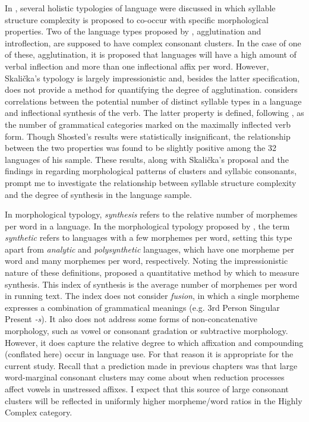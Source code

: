   In , several holistic typologies of language were discussed in which syllable structure complexity is proposed to co-occur with specific morphological properties. Two of the language types proposed by \citet{Skalička1979}, agglutination and introflection, are supposed to have complex consonant clusters. In the case of one of these, agglutination, it is proposed that languages will have a high amount of verbal inflection and more than one inflectional affix per word. However, Skalička’s typology is largely impressionistic and, besides the latter specification, does not provide a method for quantifying the degree of agglutination. \citet{Shosted2006} considers correlations between the potential number of distinct syllable types in a language and inflectional synthesis of the verb. The latter property is defined, following \citet{BickelNichols2005}, as the number of grammatical categories marked on the maximally inflected verb form. Though Shosted’s results were statistically insignificant, the relationship between the two properties was found to be slightly positive among the 32 languages of his sample. These results, along with Skalička’s proposal and the findings in  regarding morphological patterns of clusters and syllabic consonants, prompt me to investigate the relationship between syllable structure complexity and the degree of synthesis in the language sample.

  In morphological typology, \textit{synthesis} refers to the relative number of morphemes per word in a language. In the morphological typology proposed by \citet{Sapir1921}, the term \textit{synthetic} refers to languages with a few morphemes per word, setting this type apart from \textit{analytic} and \textit{polysynthetic} languages, which have one morpheme per word and many morphemes per word, respectively. Noting the impressionistic nature of these definitions, \citet{Greenberg1954} proposed a quantitative method by which to measure synthesis. This index of synthesis is the average number of morphemes per word in running text. The index does not consider \textit{fusion}, in which a single morpheme expresses a combination of grammatical meanings (e.g.  3rd Person Singular Present \textit{-s}). It also does not address some forms of non-concatenative morphology, such as vowel or consonant gradation or subtractive morphology. However, it does capture the relative degree to which affixation and compounding (conflated here) occur in language use. For that reason it is appropriate for the current study. Recall that a prediction made in previous chapters was that large word-marginal consonant clusters may come about when reduction processes affect vowels in unstressed affixes. I expect that this source of large consonant clusters will be reflected in uniformly higher morpheme/word ratios in the Highly Complex category.

